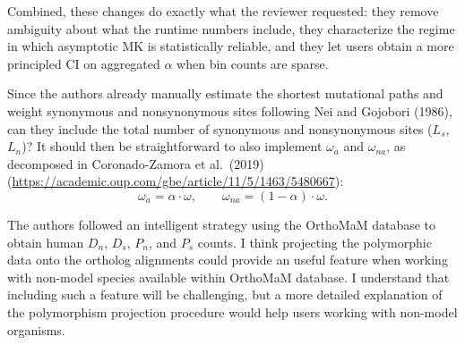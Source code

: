 {Combined, these changes do exactly what the reviewer requested:
they remove ambiguity about what the runtime numbers include, they
characterize the regime in which asymptotic MK is statistically
reliable, and they let users obtain a more principled CI on
aggregated $\alpha$ when bin counts are sparse.
}

\begin{point}{} %
Since the authors already manually estimate the shortest mutational
paths and weight synonymous and nonsynonymous sites following Nei and
Gojobori (1986), can they include the total number of synonymous and
nonsynonymous sites ($L_s$, $L_n$)? It should then be straightforward
to also implement $\omega_a$ and $\omega_{na}$, as decomposed in
Coronado-Zamora et al.\ (2019)
(\url{https://academic.oup.com/gbe/article/11/5/1463/5480667}):
\[
\omega_a = \alpha \cdot \omega, \qquad
\omega_{na} = (1 - \alpha) \cdot \omega.
\]
\end{point}


\begin{point}{} %
The authors followed an intelligent strategy using the OrthoMaM
database to obtain human $D_n$, $D_s$, $P_n$, and $P_s$ counts. I
think projecting the polymorphic data onto the ortholog alignments
could provide an useful feature when working with non-model species
available within OrthoMaM database. I understand that including such
a feature will be challenging, but a more detailed explanation of the
polymorphism projection procedure would help users working with
non-model organisms.
\end{point}

